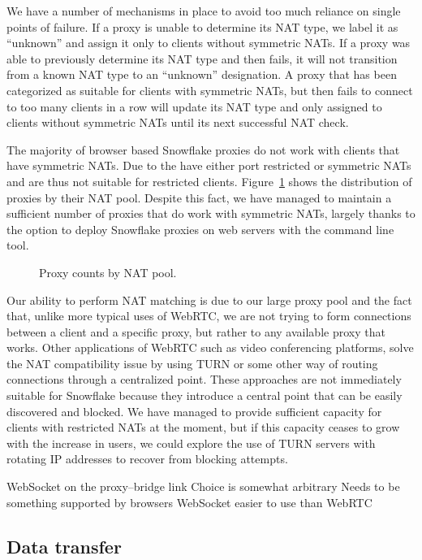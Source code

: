 \documentclass[letterpaper,twocolumn]{article}
\begin{document}
We have a number of
mechanisms in place to avoid too much reliance on single points of failure. If a
proxy is unable to determine its NAT type, we label it as ``unknown'' and assign it only to clients without symmetric NATs. If a proxy
was able to previously determine its NAT type and then fails, it will not transition from a known
NAT type to an ``unknown'' designation. A proxy that has been categorized as suitable for clients
with symmetric NATs, but then fails to connect to too many clients in a row will update its NAT type
and only assigned to clients without symmetric NATs until its next successful NAT check.

The majority of browser based Snowflake proxies do not work with clients that have symmetric NATs.
Due to the have either port restricted or symmetric NATs and are thus not suitable
for restricted clients. Figure~\ref{fig:proxies-by-nats} shows the distribution of proxies by
their NAT pool. Despite this fact, we have managed to maintain a sufficient number of proxies that do
work with symmetric NATs, largely thanks to the option to deploy Snowflake proxies on web servers with
the command line tool.

\begin{figure}
\caption{Proxy counts by NAT pool.}
\label{fig:proxies-by-nats}
\end{figure}


Our ability to perform NAT matching is due to our large proxy pool and the fact that, unlike more
typical uses of WebRTC, we are not trying to form connections between a client and a specific proxy,
but rather to any available proxy that works. Other applications of WebRTC such as video conferencing
platforms, solve the NAT compatibility issue by using TURN or some other way of routing connections
through a centralized point. These approaches are not immediately suitable for Snowflake because
they introduce a central point that can be easily discovered and blocked. We have managed to
provide sufficient capacity for clients with restricted NATs at the moment, but if this capacity
ceases to grow with the increase in users, we could explore the use of TURN servers with rotating
IP addresses to recover from blocking attempts.


WebSocket on the proxy--bridge link
Choice is somewhat arbitrary
Needs to be something supported by browsers
WebSocket easier to use than WebRTC

\subsection{Data transfer}
\label{sec:data-transfer}
\end{document}
